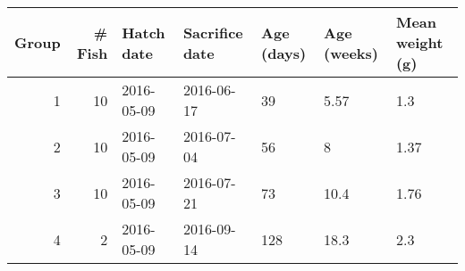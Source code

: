 \begin{tabular}{rrlllll}
  \toprule Group & \# Fish & Hatch date & Sacrifice date & Age (days) & Age (weeks) & Mean weight (g) \\ 
  \midrule 1 & 10 & 2016-05-09 & 2016-06-17 & 39 & 5.57 & 1.3 \\ 
  2 & 10 & 2016-05-09 & 2016-07-04 & 56 & 8 & 1.37 \\ 
  3 & 10 & 2016-05-09 & 2016-07-21 & 73 & 10.4 & 1.76 \\ 
  4 & 2 & 2016-05-09 & 2016-09-14 & 128 & 18.3 & 2.3 \\ 
   \bottomrule \end{tabular}
